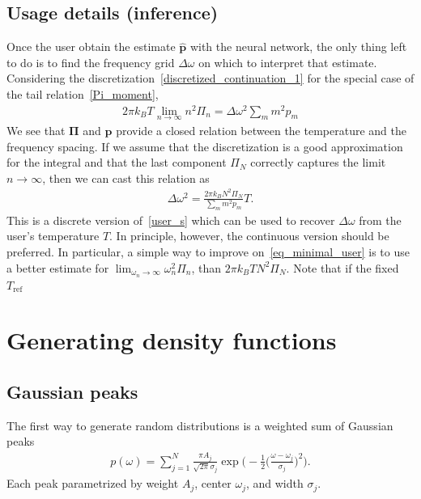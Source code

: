 \documentclass[notitlepage,11pt,nofootinbib]{revtex4-1}
\renewcommand{\vec}[1]{\bm{#1}}
\begin{document}
\subsection{Usage details (inference)}

Once the user obtain the estimate $\hat{\vec p}$ with the neural network, the only thing left to do is to find the frequency grid $\Delta\omega$ on which to interpret that estimate. Considering the discretization~\eqref{discretized_continuation_1} for the special case of the tail relation~\eqref{Pi_moment},
\begin{align}
    2\pi k_B T \lim_{n\rightarrow \infty}n^2 \Pi_n = \Delta\omega^2 \sum_m m^2 p_m
\end{align}
We see that $\vec \Pi$ and $\vec p$ provide a closed relation between the temperature and the frequency spacing. If we assume that the discretization is a good approximation for the integral and that the last component $\Pi_N$ correctly captures the limit $n\rightarrow\infty$, then we can cast this relation as
\begin{align}
    \Delta\omega^2 = 
    \frac{
        2\pi k_B 
        N^2 \Pi_N
    }{
        \sum_m m^2 p_m
    }
    T.
\label{eq_minimal_user}
\end{align}
This is a discrete version of~\eqref{user_s} which can be used to recover $\Delta\omega$ from the user's temperature $T$. In principle, however, the continuous version should be preferred. In particular, a simple way to improve on~\eqref{eq_minimal_user} is to use a better estimate for $\lim_{\omega_n\rightarrow \infty}\omega_n^2 \Pi_n$, than $2\pi k_B T N^2\Pi_N$. Note that if the fixed $T_{\text{ref}}$

\section{Generating density functions}
\label{sec_distribution}
\subsection{Gaussian peaks}
The first way to generate random distributions is a weighted sum of Gaussian peaks 
\begin{align}
p(\omega)
=
\sum_{j=1}^{N} 
\frac{\pi A_j}{\sqrt{2\pi} \sigma_j}
\exp\bigg(-\frac{1}{2}\Big(\frac{\omega-\omega_j}{\sigma_j}\Big)^2\bigg).
\end{align}
Each peak parametrized by weight $A_j$, center $\omega_j$, and width $\sigma_j$.
\end{document}
